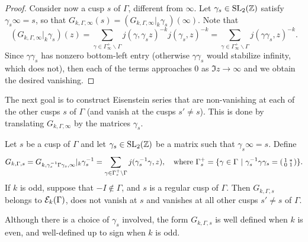 \begin{proof}
Consider now a cusp $s$ of $\Gamma$, different from $\infty$. Let $\gamma_s\in \operatorname{SL}_2(\mathbb{Z})$ satisfy $\gamma_s \infty = s$, so that $G_{k,\Gamma,\infty}(s) = (G_{k,\Gamma,\infty}|_k\gamma_s)(\infty)$. Note that
\[
(G_{k,\Gamma,\infty}|_k\gamma_s)(z) = \sum_{\gamma\in\Gamma_\infty^+\backslash\Gamma} j(\gamma,\gamma_s z)^{-k}j(\gamma_s,z)^{-k}=\sum_{\gamma\in\Gamma_\infty^+\backslash\Gamma} j(\gamma\gamma_s,z)^{-k}.
\]
Since $\gamma\gamma_s$ has nonzero bottom-left entry (otherwise $\gamma\gamma_s$ would stabilize infinity, which does not), then each of the terms approaches $0$ as $\Im z\to \infty$ and we obtain the desired vanishing.
\end{proof}

The next goal is to construct Eisenstein series that are non-vanishing at each of the other cusps $s$ of $\Gamma$ (and vanish at the cusps $s'\neq s$). This is done by translating $G_{k,\Gamma,\infty}$ by the matrices $\gamma_s$.

\begin{lemma}
  Let $s$ be a cusp of $\Gamma$ and let $\gamma_s\in\operatorname{SL}_2(\mathbb{Z})$ be a matrix such that $\gamma_s \infty = s$. Define
\[
G_{k,\Gamma,s} = G_{k,\gamma_s^{-1}\Gamma\gamma_s,\infty}|_k \gamma_s^{-1} = \sum_{\gamma\in\Gamma_s^+\backslash \Gamma} j(\gamma_s^{-1}\gamma,z),\quad\text{where }\Gamma_s^+=\{\gamma\in\Gamma~|~ \gamma_s^{-1}\gamma\gamma_s = \left(\begin{smallmatrix}1&*\\0&1\end{smallmatrix}\right)\}.
\]
If $k$ is odd, suppose that $-I\not\in\Gamma$, and $s$ is a regular cusp of $\Gamma$. Then $G_{k,\Gamma,s}$ belongs to $\mathcal{E}_k(\Gamma)$, does not vanish at $s$ and vanishes at all other cusps $s'\neq s$ of $\Gamma$.
\end{lemma}

\begin{remark}
  Although there is a choice of $\gamma_s$ involved, the form $G_{k,\Gamma,s}$ is well defined when $k$ is even, and well-defined  up to sign when $k$ is odd.
\end{remark}

